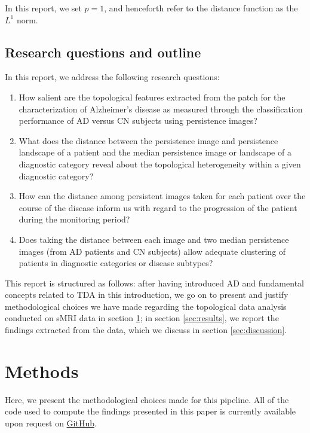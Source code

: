 \documentclass{article}
\begin{document}
In this report, we set $p=1$, and henceforth refer to the distance function as the $L^1$ norm.

\subsection{Research questions and outline}

In this report, we address the following research questions:

\begin{enumerate}
\item How salient are the topological features extracted from the patch for the characterization of
  Alzheimer's disease as measured through the classification performance of AD
  versus CN subjects using persistence images?
\item What does the distance between the persistence image and persistence
landscape of a patient and the median persistence image or landscape of a
diagnostic category reveal about the topological heterogeneity within a given
diagnostic category?
\item How can the distance among persistent images taken for each patient over the course of the
  disease inform us with regard to the progression of the patient during the monitoring period?
\item Does taking the distance between each image and two median persistence
images (from AD patients and CN subjects) allow adequate clustering of patients
in diagnostic categories or disease subtypes?
\end{enumerate}

This report is structured as follows: after having introduced AD and fundamental concepts related to
TDA in this introduction, we go on to present and justify methodological choices we have made
regarding the topological data analysis conducted on sMRI data in section \ref{sec:methods}; in
section \ref{sec:results}, we report the findings extracted from the data, which we discuss in
section \ref{sec:discussion}.

\section{Methods}\label{sec:methods}

Here, we present the methodological choices made for this pipeline. All of the code used to compute
the findings presented in this paper is currently available upon request on
\href{https://github.com/pjhartout/TDA_ADNI_MLCB}{GitHub}.
\end{document}

